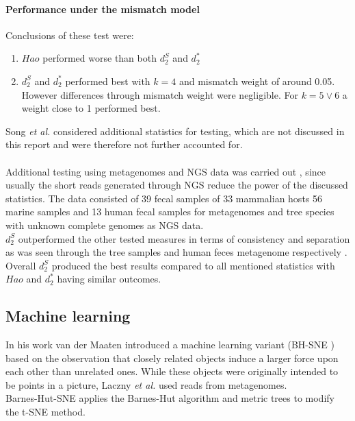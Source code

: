 \documentclass[twocolumn]{bmcart}%
\begin{document}
\paragraph*{Performance under the mismatch model}
Conclusions of these test were: 
\begin{enumerate}
\item $Hao$ performed worse than both $d_2^S$ and $d_2^*$	
\item $d_2^S$ and $d_2^*$ performed best with $k=4$ and mismatch weight of around 0.05. However differences through mismatch weight were negligible. For $k=5 \lor 6$ a weight close to 1 performed best.
\end{enumerate}
Song \textit{et al.} considered additional statistics for testing, which are not discussed in this report and were therefore not further accounted for.\\
\\
Additional testing using metagenomes and NGS data was carried out \cite{doi:10.1093/bib/bbt067}, since usually the short reads generated through NGS reduce the power of the discussed statistics. The data consisted of 39 fecal samples of 33 mammalian hosts \cite{muegge2011diet} 56 marine samples \cite{rusch2007sorcerer} and 13 human fecal samples \cite{kurokawa2007comparative} for metagenomes and tree species with unknown complete genomes as NGS data.\\
$d_2^S$ outperformed the other tested measures in terms of consistency and separation as was seen through the tree samples and human feces metagenome respectively \cite{doi:10.1093/bib/bbt067}. \\
Overall $d_2^S$ produced the best results compared to all mentioned statistics with $Hao$ and $d_2^*$ having similar outcomes.
\subsection*{Machine learning}
In his work van der Maaten \cite{DBLP:journals/corr/abs-1301-3342} introduced a machine learning variant (BH-SNE ) based on the observation that closely related objects induce a larger force upon each other than unrelated ones. While these objects were originally intended to be points in a picture, Laczny \textit{et al.}\cite{Laczny2014} used reads from metagenomes.\\
Barnes-Hut-SNE applies the Barnes-Hut algorithm and metric trees to modify the t-SNE method.
\end{document}
